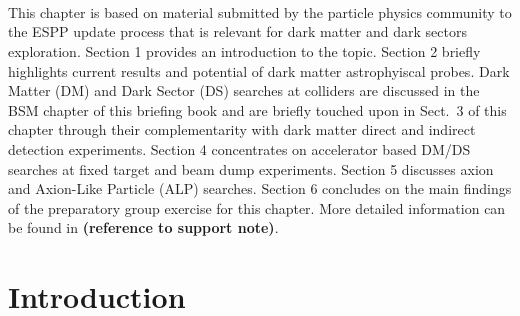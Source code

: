 


~\\
~\\
~\\


\noindent This chapter is based on material submitted by the particle physics community to the  ESPP update process that is relevant for dark matter and dark sectors exploration. Section 1 provides an introduction to the topic. Section 2 briefly highlights current results and potential of dark matter astrophyiscal probes.
Dark Matter (DM)  and Dark Sector (DS) searches at colliders are discussed in the BSM chapter of this briefing book and are briefly touched upon in Sect.~3 of this chapter through their complementarity with dark matter direct and indirect  detection experiments. Section 4 concentrates on accelerator based DM/DS searches at fixed target and beam dump experiments. Section 5 discusses axion and Axion-Like Particle (ALP) searches. Section 6 concludes on the main findings of the preparatory group exercise for this chapter. More detailed information can be found in %
{\bf (reference to support note)}.


\section{Introduction}


